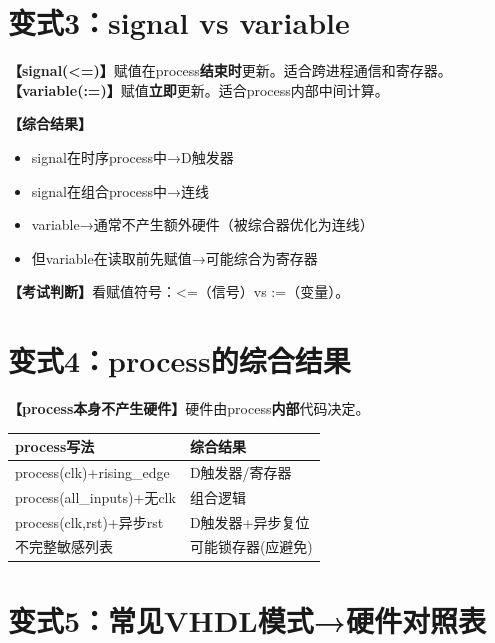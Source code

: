 \section{变式3：signal vs variable}

\begin{detailbox}[完整教学]
\textbf{【signal(<=)】}赋值在process\textbf{结束时}更新。适合跨进程通信和寄存器。
\textbf{【variable(:=)】}赋值\textbf{立即}更新。适合process内部中间计算。

\textbf{【综合结果】}
\begin{itemize}
  \item signal在时序process中→D触发器
  \item signal在组合process中→连线
  \item variable→通常不产生额外硬件（被综合器优化为连线）
  \item 但variable在读取前先赋值→可能综合为寄存器
\end{itemize}

\textbf{【考试判断】}看赋值符号：<=（信号）vs :=（变量）。
\end{detailbox}


\section{变式4：process的综合结果}

\begin{detailbox}[完整教学]
\textbf{【process本身不产生硬件】}硬件由process\textbf{内部}代码决定。

\begin{center}
\begin{tabular}{|l|l|}
\hline
\textbf{process写法} & \textbf{综合结果} \\
\hline
process(clk)+rising\_edge & D触发器/寄存器 \\
process(all\_inputs)+无clk & 组合逻辑 \\
process(clk,rst)+异步rst & D触发器+异步复位 \\
不完整敏感列表 & 可能锁存器(应避免) \\
\hline
\end{tabular}
\end{center}
\end{detailbox}


\section{变式5：常见VHDL模式→硬件对照表}

